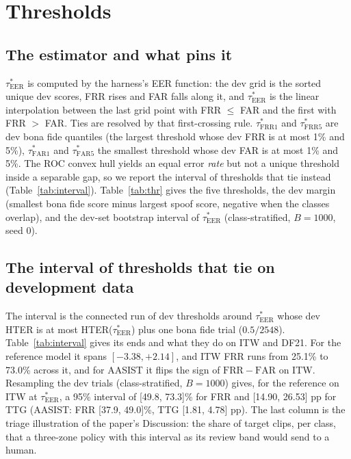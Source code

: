 \documentclass[10pt]{article}
\newcommand{\frr}{\mathrm{FRR}}
\newcommand{\far}{\mathrm{FAR}}
\newcommand{\tauE}{\tau^{*}_{\mathrm{EER}}}
\newcommand{\tauF}[1]{\tau^{*}_{\mathrm{FRR}#1}}
\newcommand{\tauA}[1]{\tau^{*}_{\mathrm{FAR}#1}}
\newcommand{\wide}[1]{\begingroup\footnotesize\setlength{\tabcolsep}{3.5pt}\resizebox{\textwidth}{!}{}\endgroup}
\begin{document}
\begin{table}[!ht]
\caption{H1 and H4 as registered (Spearman \(\rho\), bootstrap over points, \(B=1000\)).}
\label{tab:h14}
\centering
\footnotesize

\end{table}

\section{Thresholds}
\subsection{The estimator and what pins it}
\(\tauE\) is computed by the harness's EER function: the dev grid is the sorted unique dev scores, FRR rises and FAR falls along it, and
\(\tauE\) is the linear interpolation between the last grid point with FRR \(\le\) FAR and the first with FRR \(>\) FAR. Ties are resolved
by that first-crossing rule. \(\tauF{1}\) and \(\tauF{5}\) are dev bona fide quantiles (the largest threshold whose dev FRR is at most 1\%
and 5\%), \(\tauA{1}\) and \(\tauA{5}\) the smallest threshold whose dev FAR is at most 1\% and 5\%. The ROC convex hull yields an equal
error \emph{rate} but not a unique threshold inside a separable gap, so we report the interval of thresholds that tie instead
(Table~\ref{tab:interval}). Table~\ref{tab:thr} gives the five thresholds, the dev margin (smallest bona fide score minus largest spoof score, negative when the classes overlap), and the dev-set bootstrap interval of \(\tauE\) (class-stratified, \(B=1000\), seed 0).

\begin{table}[!ht]
\caption{Development thresholds, margins and the dev-bootstrap interval of \(\tauE\).}
\label{tab:thr}
\centering
\wide{s_tab_thresholds}
\end{table}

\subsection{The interval of thresholds that tie on development data}
The interval is the connected run of dev thresholds around \(\tauE\) whose dev HTER is at most HTER(\(\tauE\)) plus one bona fide trial
(\(0.5/2548\)). Table~\ref{tab:interval} gives its ends and what they do on ITW and DF21. For the reference model it spans
\([-3.38,+2.14]\), and ITW FRR runs from 25.1\% to 73.0\% across it, and for AASIST it flips the sign of \(\frr-\far\) on ITW.
Resampling the dev trials (class-stratified, \(B=1000\)) gives, for the reference on ITW at \(\tauE\), a 95\% interval of
[49.8, 73.3]\% for FRR and [14.90, 26.53] pp for TTG (AASIST: FRR [37.9, 49.0]\%, TTG [1.81, 4.78] pp). The last column is the triage
illustration of the paper's Discussion: the share of target clips, per class, that a three-zone policy with this interval as its review band
would send to a human.
\end{document}
